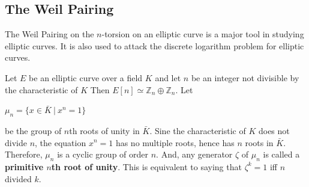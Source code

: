 \documentclass[a4paper, 12pt]{article}
\begin{document}
\subsection{The Weil Pairing}
The Weil Pairing on the $n$-torsion on an elliptic curve is a major tool in studying elliptic curves. It is also used to attack the discrete logarithm problem for elliptic curves. \par
Let $E$ be an elliptic curve over a field $K$ and let $n$ be an integer not divisible by the characteristic of $K$ Then $E[n] \simeq \mathbb{Z}_n \oplus \mathbb{Z}_n$. Let 
\begin{center} $\mu_n = \{x \in \bar{K} \: | \: x^n = 1\}$ \end{center}
be the group of $n$th roots of unity in $\bar{K}$. Sine the characteristic of $K$ does not divide $n$, the equation $x^n=1$ has no multiple roots, hence has $n$ roots in $\bar{K}$. Therefore, $\mu_n$ is a cyclic group of order $n$. And, any generator $\zeta$ of $\mu_n$ is called a \textbf{primitive $n$th root of unity}. This is equivalent to saying that $\zeta^k = 1$ iff $n$ divided $k$. 
\end{document}
